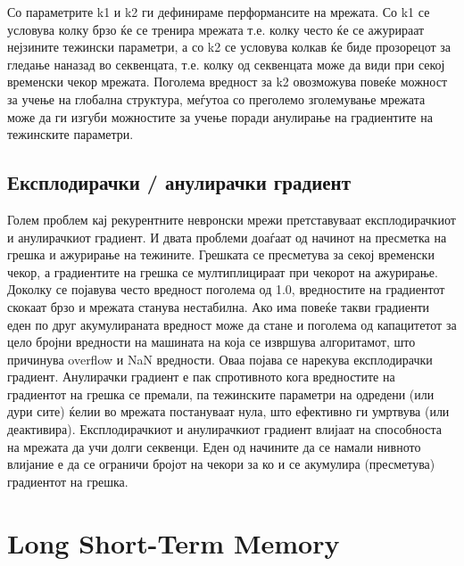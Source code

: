Со параметрите k1 и k2 ги дефинираме перформансите на мрежата. Со k1 се условува колку брзо ќе се тренира мрежата т.е. колку често ќе се ажурираат нејзините тежински параметри, а со k2 се условува колкав ќе биде прозорецот за гледање наназад во секвенцата, т.е. колку од секвенцата може да види при секој временски чекор мрежата. Поголема вредност за k2 овозможува повеќе можност за учење на глобална структура, меѓутоа со преголемо зголемување мрежата може да ги изгуби можностите за учење поради анулирање на градиентите на тежинските параметри.

\subsection{Експлодирачки / анулирачки градиент}

Голем проблем кај рекурентните невронски мрежи претставуваат експлодирачкиот и анулирачкиот градиент. И двата проблеми доаѓаат од начинот на пресметка на грешка и ажурирање на тежините. Грешката се пресметува за секој временски чекор, а градиентите на грешка се мултиплицираат при чекорот на ажурирање. Доколку се појавува често вредност поголема од 1.0, вредностите на градиентот скокаат брзо и мрежата станува нестабилна. Ако има повеќе такви градиенти еден по друг акумулираната вредност може да стане и поголема од капацитетот за цело бројни вредности на машината на која се извршува алгоритамот, што причинува overflow и NaN вредности. Оваа појава се нарекува експлодирачки градиент. Анулирачки градиент е пак спротивното кога вредностите на градиентот на грешка се премали, па тежинските параметри на одредени (или дури сите) ќелии во мрежата постануваат нула, што ефективно ги умртвува (или деактивира). Експлодирачкиот и анулирачкиот градиент влијаат на способноста на мрежата да учи долги секвенци. Еден од начините да се намали нивното влијание е да се ограничи бројот на чекори за ко    и се акумулира (пресметува) градиентот на грешка.

\section{Long Short-Term Memory}

